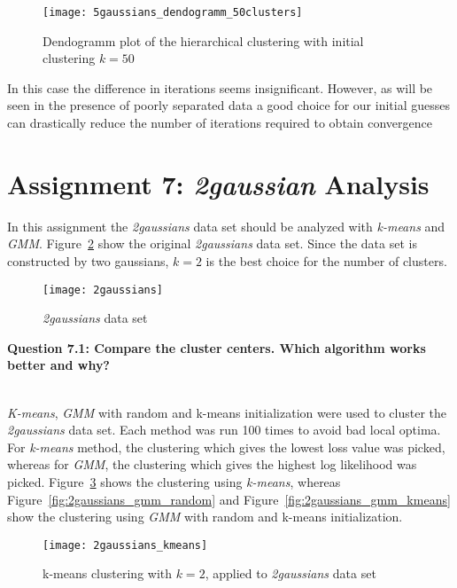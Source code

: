 \begin{figure}[h!]
	\centering
	\texttt{[image: 5gaussians\_dendogramm\_50clusters]}
	\caption{Dendogramm plot of the hierarchical clustering with initial clustering $k=50$}
	\label{fig:5gaussians_dendogramm_50clusters}
\end{figure}

In this case the difference in iterations
seems insignificant. However, as will be seen in the presence of poorly separated data a good choice for our
initial guesses can drastically reduce the number of iterations required to obtain convergence


\section{Assignment 7: \textit{2gaussian} Analysis}
\label{assignment7}

In this assignment the \textit{2gaussians} data set should be analyzed with \textit{k-means} and \textit{GMM}. Figure~\ref{fig:2gaussians} show the original \textit{2gaussians} data set. Since the data set is constructed by two gaussians, $k=2$ is the best choice for the number of clusters.

\begin{figure}[h!]
	\centering
	\texttt{[image: 2gaussians]}
	\caption{\textit{2gaussians} data set}
	\label{fig:2gaussians}
\end{figure}

{\raggedright \textbf{Question 7.1: Compare the cluster centers. Which algorithm works better and why?}}\\

\textit{K-means}, \textit{GMM} with random and k-means initialization were used to cluster the \textit{2gaussians} data set. Each method was run 100 times to avoid bad local optima. For \textit{k-means} method, the clustering which gives the lowest loss value was picked, whereas for \textit{GMM}, the clustering which gives the highest log likelihood was picked. Figure~\ref{fig:2gaussians_kmeans} shows the clustering using \textit{k-means}, whereas Figure~\ref{fig:2gaussians_gmm_random} and Figure~\ref{fig:2gaussians_gmm_kmeans} show the clustering using \textit{GMM} with random and k-means initialization.

\begin{figure}[h!]
	\centering
	\texttt{[image: 2gaussians\_kmeans]}
	\caption{k-means clustering with $k=2$, applied to \textit{2gaussians} data set}
	\label{fig:2gaussians_kmeans}
\end{figure}

